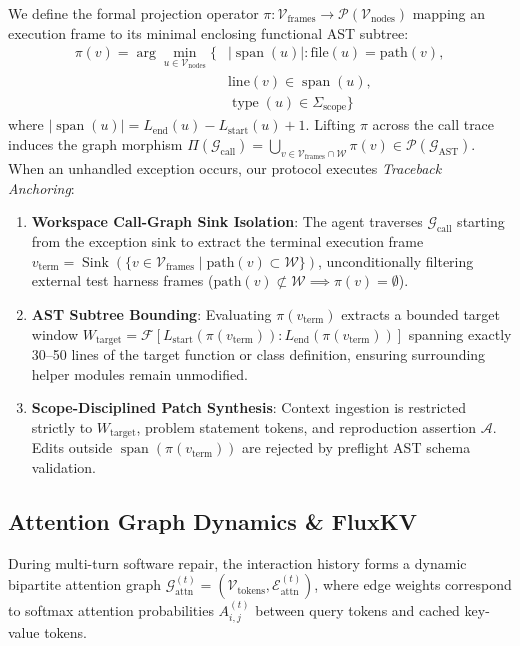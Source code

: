 \documentclass[10pt,twocolumn]{article}
\begin{document}
We define the formal projection operator $\pi: \mathcal{V}_{\text{frames}} \to \mathcal{P}(\mathcal{V}_{\text{nodes}})$ mapping an execution frame to its minimal enclosing functional AST subtree:
\begin{equation}
\begin{split}
    \pi(v) = \arg\min_{u \in \mathcal{V}_{\text{nodes}}} \Big\{ &|\operatorname{span}(u)| : \text{file}(u) = \text{path}(v), \\
    &\text{line}(v) \in \operatorname{span}(u), \\
    &\operatorname{type}(u) \in \Sigma_{\text{scope}} \Big\}
\end{split}
\end{equation}
where $|\operatorname{span}(u)| = L_{\text{end}}(u) - L_{\text{start}}(u) + 1$. Lifting $\pi$ across the call trace induces the graph morphism $\Pi(\mathcal{G}_{\text{call}}) = \bigcup_{v \in \mathcal{V}_{\text{frames}} \cap \mathcal{W}} \pi(v) \in \mathcal{P}(\mathcal{G}_{\text{AST}})$. When an unhandled exception occurs, our protocol executes \textit{Traceback Anchoring}:
\begin{enumerate}
    \item \textbf{Workspace Call-Graph Sink Isolation}: The agent traverses $\mathcal{G}_{\text{call}}$ starting from the exception sink to extract the terminal execution frame $v_{\text{term}} = \operatorname{Sink}(\{v \in \mathcal{V}_{\text{frames}} \mid \text{path}(v) \subset \mathcal{W}\})$, unconditionally filtering external test harness frames ($\text{path}(v) \not\subset \mathcal{W} \implies \pi(v) = \emptyset$).
    \item \textbf{AST Subtree Bounding}: Evaluating $\pi(v_{\text{term}})$ extracts a bounded target window $W_{\text{target}} = \mathcal{F}[L_{\text{start}}(\pi(v_{\text{term}})) : L_{\text{end}}(\pi(v_{\text{term}}))]$ spanning exactly 30--50 lines of the target function or class definition, ensuring surrounding helper modules remain unmodified.
    \item \textbf{Scope-Disciplined Patch Synthesis}: Context ingestion is restricted strictly to $W_{\text{target}}$, problem statement tokens, and reproduction assertion $\mathcal{A}$. Edits outside $\operatorname{span}(\pi(v_{\text{term}}))$ are rejected by preflight AST schema validation.
\end{enumerate}

\subsection{Attention Graph Dynamics \& FluxKV}
During multi-turn software repair, the interaction history forms a dynamic bipartite attention graph $\mathcal{G}_{\text{attn}}^{(t)} = (\mathcal{V}_{\text{tokens}}, \mathcal{E}_{\text{attn}}^{(t)})$, where edge weights correspond to softmax attention probabilities $A_{i,j}^{(t)}$ between query tokens and cached key-value tokens.
\end{document}
